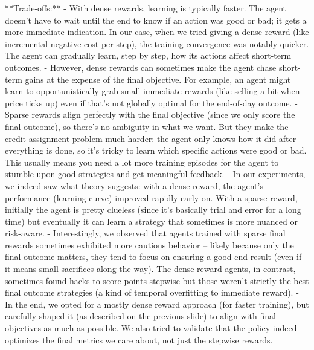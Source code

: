 \documentclass[11pt]{article}
\begin{document}
		**Trade-offs:**
		- With dense rewards, learning is typically faster. The agent doesn’t have to wait until the end to know if an action was good or bad; it gets a more immediate indication. In our case, when we tried giving a dense reward (like incremental negative cost per step), the training convergence was notably quicker. The agent can gradually learn, step by step, how its actions affect short-term outcomes.
		- However, dense rewards can sometimes make the agent chase short-term gains at the expense of the final objective. For example, an agent might learn to opportunistically grab small immediate rewards (like selling a bit when price ticks up) even if that’s not globally optimal for the end-of-day outcome.
		- Sparse rewards align perfectly with the final objective (since we only score the final outcome), so there’s no ambiguity in what we want. But they make the credit assignment problem much harder: the agent only knows how it did after everything is done, so it’s tricky to learn which specific actions were good or bad. This usually means you need a lot more training episodes for the agent to stumble upon good strategies and get meaningful feedback.
		- In our experiments, we indeed saw what theory suggests: with a dense reward, the agent’s performance (learning curve) improved rapidly early on. With a sparse reward, initially the agent is pretty clueless (since it’s basically trial and error for a long time) but eventually it can learn a strategy that sometimes is more nuanced or risk-aware.
		- Interestingly, we observed that agents trained with sparse final rewards sometimes exhibited more cautious behavior – likely because only the final outcome matters, they tend to focus on ensuring a good end result (even if it means small sacrifices along the way). The dense-reward agents, in contrast, sometimes found hacks to score points stepwise but those weren’t strictly the best final outcome strategies (a kind of temporal overfitting to immediate reward).
		- In the end, we opted for a mostly dense reward approach (for faster training), but carefully shaped it (as described on the previous slide) to align with final objectives as much as possible. We also tried to validate that the policy indeed optimizes the final metrics we care about, not just the stepwise rewards.
	
	
	
\end{document}
